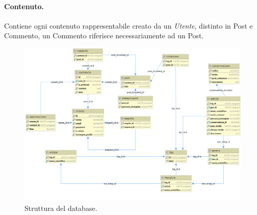 \documentclass[12pt, a4paper]{article}
\begin{document}
    \paragraph{Contenuto.} Contiene ogni contenuto rappresentabile creato da un \emph{Utente}, distinto in
                            Post e Commento, un Commento riferisce necessariamente ad un Post.
    \begin{figure}[htbp]
        \caption{Struttura del database.}
        \label{fig:database}
        \hspace*{-2cm}
        \includegraphics[scale= 0.5]{webBirdDB@localhost.png}
    \end{figure}
\end{document}
